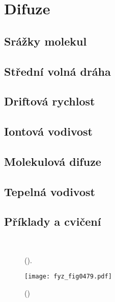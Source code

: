 \setchaptertoc
\chapter{Difuze}\label{fyz:IchapXLIII}

  \section{Srážky molekul}\label{fyz:IchapXLIIIsecI}
  \section{Střední volná dráha}\label{fyz:IchapXLIIIsecII}
  \section{Driftová rychlost}\label{fyz:IchapXLIIIsecIII}
  \section{Iontová vodivost}\label{fyz:IchapXLIIIsecIV}
  \section{Molekulová difuze}\label{fyz:IchapXLIIIsecV}
  \section{Tepelná vodivost}\label{fyz:IchapXLIIIsecVI}
  \section{Příklady a cvičení}\label{fyz:IchapXLIIIsecVII}

  \begin{figure}[hb!] %
    \centering
      \\
    \caption{
             (\cite[s.~601]{Feynman01}).}
    \label{fyz:fig0478}
  \end{figure}

    \begin{figure}[ht!] %
      \centering
      \texttt{[image: fyz\_fig0479.pdf]}
      \caption{ 
               (\cite[s.~707]{Feynman01})}
      \label{fyz:fig0479}
    \end{figure}
